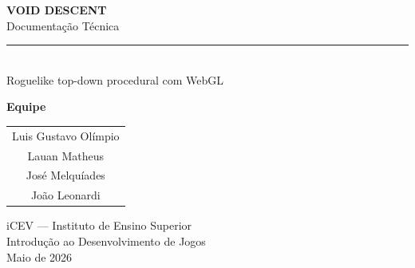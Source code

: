 \documentclass[11pt,a4paper,oneside]{report}
\begin{document}
\begin{titlepage}
  \centering
  \vspace*{3cm}

  {\Huge\bfseries VOID DESCENT}\\[0.6cm]
  {\Large Documentação Técnica}\\[0.5cm]
  \rule{0.6\textwidth}{0.4pt}\\[1cm]
  {\large Roguelike top-down procedural com WebGL}

  \vspace{2.5cm}

  {\large\textbf{Equipe}}\\[0.5cm]
  \begin{tabular}{c}
    Luis Gustavo Olímpio \\
    Lauan Matheus \\
    José Melquíades \\
    João Leonardi
  \end{tabular}

  \vfill

  iCEV --- Instituto de Ensino Superior\\
  Introdução ao Desenvolvimento de Jogos\\
  \vspace{0.3cm}
  Maio de 2026
\end{titlepage}

\tableofcontents
\listoffigures

\clearpage










\end{document}
